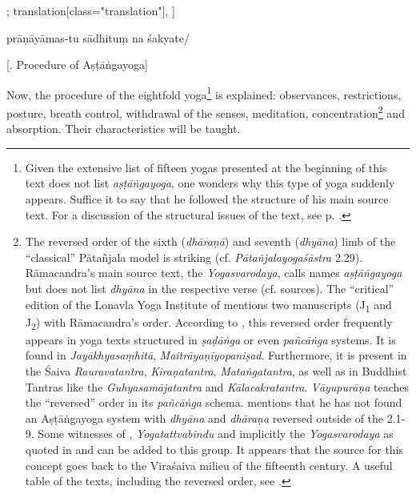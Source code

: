 \begin{alignment}[
  texts=edition[class="edition"];
  translation[class="translation"],
  ]
\begin{edition}
\begin{prose}
prāṇāyāmas-tu
sādhituṃ na śakyate/
    \end{prose}
  \end{edition}
  \begin{translation}
    \centerline{\textrm{\small{[. Procedure of Aṣṭāṅgayoga]}}}
    \bigskip
    \begin{tlate}
\noindent
Now, the procedure of the eightfold yoga\footnote{Given the extensive list of fifteen yogas presented at the beginning of this text does not list \textit{aṣṭāṅgayoga}, one wonders why this type of yoga suddenly appears. Suffice it to say that he followed the structure of his main source text. For a discussion of the structural issues of the text, see p. \pageref{structure}.} is explained: observances, restrictions, posture, breath control, withdrawal of the senses, meditation, concentration\footnote{The reversed order of the sixth (\textit{dhāraṇā}) and seventh (\textit{dhyāna}) limb of the ``classical'' Pātañjala model is striking (cf. \textit{Pātañjalayogaśāstra} 2.29). Rāmacandra's main source text, the \textit{Yogasvarodaya}, calls names \textit{aṣṭāṅgayoga} but does not list \textit{dhyāna} in the respective verse (cf. sources). The ``critical'' edition of the Lonavla Yoga Institute of  mentions two manuscripts (J\textsubscript{1} and J\textsubscript{2}) with Rāmacandra's order. According to \citeauthor[2004: 380-381]{vasudeva2004}, this reversed order frequently appears in yoga texts structured in \textit{ṣaḍāṅga} or even \textit{pañcāṅga} systems. It is found in \textit{Jayākhyasaṃhitā}, \textit{Maitrāyaṇīyopaniṣad}. Furthermore, it is present in the Śaiva \textit{Rauravatantra}, \textit{Kiraṇatantra}, \textit{Mataṅgatantra}, as well as in Buddhist Tantras like the \textit{Guhyasamājatantra} and \textit{Kālacakratantra}. \textit{Vāyupurāṇa} teaches the ``reversed'' order in its \textit{pañcāṅga} schema. \citeauthor[2023:168]{shivayogapradipika} mentions that he has not found an Aṣṭāṅgayoga system with \textit{dhyāna} and \textit{dhāraṇa} reversed outside of the  2.1-9. Some witnesses of , \textit{Yogatattvabindu} and implicitly the \textit{Yogasvarodaya} as quoted in  and  can be added to this group. It appears that the source for this concept goes back to the Vīraśaiva milieu of the fifteenth century. A useful table of the texts, including the reversed order, see \citeauthor[2023:166]{shivayogapradipika}.} and absorption. Their characteristics will be taught.


\end{tlate}
\end{translation}
\end{alignment}
